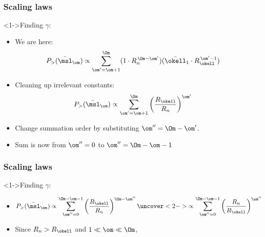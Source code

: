 \begin{frame}[label=]
  \frametitle{Scaling laws}

  \begin{block}<1->{Finding $\gamma$:}
    \begin{itemize}
    \item<1-> We are here:
      $$
      P_> (\bar{\msl}_\om)
      \propto
      \sum_{\om'=\om+1}^{\Om} 
      (1 \cdot R_n^{\, \Om-\om'})
      (\bar{\okell}_1 \cdot R_\okell^{\, \om'-1})
      $$
    \item<2-> Cleaning up irrelevant constants:
      $$
      P_> (\bar{\msl}_\om)
      \propto
      \sum_{\om'=\om+1}^{\Om} 
      \left(
        \frac{R_\okell}{R_n}
      \right)^{\om'}
      $$
    \item<3-> Change summation order by substituting $\om'' = \Om - \om'$.
    \item<4-> Sum is now from $\om''=0$ to $\om'' = \Om - \om - 1$
    \end{itemize}
  \end{block}

\end{frame}

\begin{frame}[label=]
  \frametitle{Scaling laws}

  \begin{block}<1->{Finding $\gamma$:}
    \begin{itemize}
    \item<1->
      $$
      P_> (\bar{\msl}_\om)
      \propto
      \sum_{\om''=0}^{\Om-\om-1} 
      \left(
        \frac{R_\okell}{R_n}
      \right)^{\Om-\om''}
      \uncover<2->{
        \propto
        \sum_{\om''=0}^{\Om-\om-1} 
        \left(
          \frac{R_n}{R_\okell}
        \right)^{\om''}
        }
      $$
    \item<3-> Since $R_n > R_\okell$ and $1 \ll \om \ll \Om$,
    \end{itemize}
  \end{block}

\end{frame}

